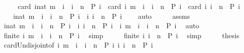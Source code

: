 \begin{isabellebody}
\ \ \ \ \ {\isacartoucheopen}card\ {\isacharbraceleft}i{\isacharcolon}{\isacharcolon}nat{\isachardot}\ m\ {\isacharless}\ i\ {\isasymand}\ i\ {\isasymle}\ n\ {\isasymand}\ P\ i{\isacharbraceright}\ {\isacharequal}\ card\ {\isacharbraceleft}i{\isachardot}\ m\ {\isacharless}\ i\ {\isasymand}\ i\ {\isacharless}\ n\ {\isasymand}\ P\ i{\isacharbraceright}\ {\isacharplus}\ card\ {\isacharbraceleft}i{\isachardot}\ i\ {\isacharequal}\ n\ {\isasymand}\ P\ i{\isacharbraceright}{\isacartoucheclose}\isanewline
%
\isadelimproof
%
\endisadelimproof
%
\isatagproof
{}\isamarkupfalse%
\ {\isacharminus}\isanewline
\ \ \isamarkupfalse%
\ {\isacartoucheopen}{\isacharbraceleft}i{\isacharcolon}{\isacharcolon}nat{\isachardot}\ m\ {\isacharless}\ i\ {\isasymand}\ i\ {\isacharless}\ n\ {\isasymand}\ P\ i{\isacharbraceright}\ {\isasyminter}\ {\isacharbraceleft}i{\isachardot}\ i\ {\isacharequal}\ n\ {\isasymand}\ P\ i{\isacharbraceright}\ {\isacharequal}\ {\isacharbraceleft}{\isacharbraceright}{\isacartoucheclose}\ \isamarkupfalse%
\ auto\isanewline
\ \ \isamarkupfalse%
\ \isamarkupfalse%
\ assms\ \isamarkupfalse%
\ {\isacartoucheopen}{\isacharbraceleft}i{\isacharcolon}{\isacharcolon}nat{\isachardot}\ m\ {\isacharless}\ i\ {\isasymand}\ i\ {\isacharless}\ n\ {\isasymand}\ P\ i{\isacharbraceright}\ {\isasymunion}\ {\isacharbraceleft}i{\isachardot}\ i\ {\isacharequal}\ n\ {\isasymand}\ P\ i{\isacharbraceright}\ {\isacharequal}\ {\isacharbraceleft}i{\isachardot}\ m\ {\isacharless}\ i\ {\isasymand}\ i\ {\isasymle}\ n\ {\isasymand}\ P\ i{\isacharbraceright}{\isacartoucheclose}\ \isamarkupfalse%
\ auto\isanewline
\ \ \isamarkupfalse%
\ \isamarkupfalse%
\ {\isacartoucheopen}finite\ {\isacharbraceleft}i{\isachardot}\ m\ {\isacharless}\ i\ {\isasymand}\ i\ {\isacharless}\ n\ {\isasymand}\ P\ i{\isacharbraceright}{\isacartoucheclose}\ \isamarkupfalse%
\ simp\isanewline
\ \ \isamarkupfalse%
\ \isamarkupfalse%
\ {\isacartoucheopen}finite\ {\isacharbraceleft}i{\isachardot}\ i\ {\isacharequal}\ n\ {\isasymand}\ P\ i{\isacharbraceright}{\isacartoucheclose}\ \isamarkupfalse%
\ simp\isanewline
\ \ \isamarkupfalse%
\ \isamarkupfalse%
\ {\isacharquery}thesis\ \isamarkupfalse%
\ card{\isacharunderscore}Un{\isacharunderscore}disjoint{\isacharbrackleft}of\ {\isacartoucheopen}{\isacharbraceleft}i{\isachardot}\ m\ {\isacharless}\ i\ {\isasymand}\ i\ {\isacharless}\ n\ {\isasymand}\ P\ i{\isacharbraceright}{\isacartoucheclose}\ {\isacartoucheopen}{\isacharbraceleft}i{\isachardot}\ i\ {\isacharequal}\ n\ {\isasymand}\ P\ i{\isacharbraceright}{\isacartoucheclose}{\isacharbrackright}\ \isamarkupfalse%

\end{isabellebody}
